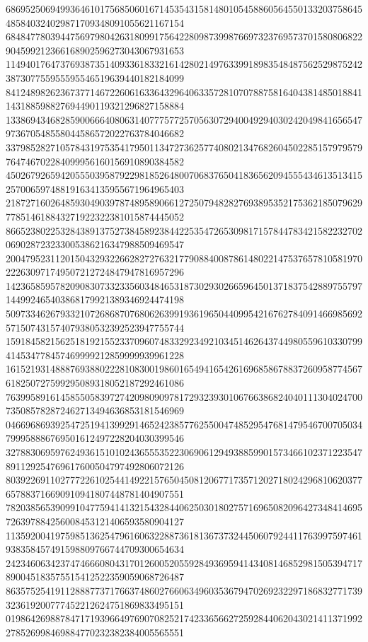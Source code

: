 \begin{DoxyCode}
      686952506949936461017568506016714535431581480105458860564550133203758645485840324029871709348091055621167154
      684847780394475697980426318099175642280987399876697323769573701580806822904599212366168902596273043067931653
      114940176473769387351409336183321614280214976339918983548487562529875242387307755955595546519639440182184099
      841248982623673771467226061633643296406335728107078875816404381485018841143188598827694490119321296827158884
      133869434682859006664080631407775772570563072940049294030242049841656547973670548558044586572022763784046682
      337985282710578431975354179501134727362577408021347682604502285157979579764746702284099956160156910890384582
      450267926594205550395879229818526480070683765041836562094555434613513415257006597488191634135955671964965403
      218727160264859304903978748958906612725079482827693895352175362185079629778514618843271922322381015874445052
      866523802253284389137527384589238442253547265309817157844783421582232702069028723233005386216347988509469547
      200479523112015043293226628272763217790884008786148022147537657810581970222630971749507212724847947816957296
      142365859578209083073323356034846531873029302665964501371837542889755797144992465403868179921389346924474198
      509733462679332107268687076806263991936196504409954216762784091466985692571507431574079380532392523947755744
      159184582156251819215523370960748332923492103451462643744980559610330799414534778457469999212859999939961228
      161521931488876938802228108300198601654941654261696858678837260958774567618250727599295089318052187292461086
      763995891614585505839727420980909781729323930106766386824040111304024700735085782872462713494636853181546969
      046696869392547251941399291465242385776255004748529547681479546700705034799958886769501612497228204030399546
      327883069597624936151010243655535223069061294938859901573466102371223547891129254769617600504797492806072126
      803922691102777226102544149221576504508120677173571202718024296810620377657883716690910941807448781404907551
      782038565390991047759414132154328440625030180275716965082096427348414695726397884256008453121406593580904127
      113592004197598513625479616063228873618136737324450607924411763997597461938358457491598809766744709300654634
      242346063423747466608043170126005205592849369594143408146852981505394717890045183575515412522359059068726487
      863575254191128887737176637486027660634960353679470269232297186832771739323619200777452212624751869833495151
      019864269887847171939664976907082521742336566272592844062043021411371992278526998469884770232382384005565551

\end{DoxyCode}
